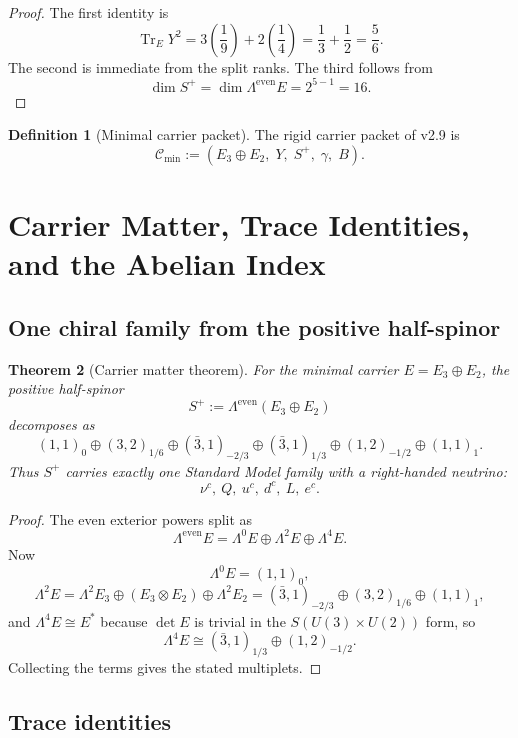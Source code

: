 \documentclass[11pt,a4paper]{article}
\newtheorem{theorem}{Theorem}[section]
\theoremstyle{definition}
\newtheorem{definition}[theorem]{Definition}
\theoremstyle{remark}
\newcommand{\tr}{\operatorname{Tr}}
\newcommand{\Cmin}{\mathcal C_{\min}}
\begin{document}
\begin{proof}
The first identity is
\[
\tr_EY^2 = 3\left(\frac19\right)+2\left(\frac14\right)=\frac13+\frac12=\frac56.
\]
The second is immediate from the split ranks. The third follows from
\[
\dim S^+ = \dim \Lambda^{\mathrm{even}}E = 2^{5-1}=16.
\]
\end{proof}

\begin{definition}[Minimal carrier packet]
The rigid carrier packet of v2.9 is
\[
\Cmin := (E_3\oplus E_2,\;Y,\;S^+,\;\gamma,\;B).
\]
\end{definition}

\section{Carrier Matter, Trace Identities, and the Abelian Index}

\subsection{One chiral family from the positive half-spinor}

\begin{theorem}[Carrier matter theorem]
For the minimal carrier $E=E_3\oplus E_2$, the positive half-spinor
\[
S^+ := \Lambda^{\mathrm{even}}(E_3\oplus E_2)
\]
decomposes as
\[
(1,1)_0
\oplus
(3,2)_{1/6}
\oplus
(\bar 3,1)_{-2/3}
\oplus
(\bar 3,1)_{1/3}
\oplus
(1,2)_{-1/2}
\oplus
(1,1)_1.
\]
Thus $S^+$ carries exactly one Standard Model family with a right-handed neutrino:
\[
\nu^c,\ Q,\ u^c,\ d^c,\ L,\ e^c.
\]
\end{theorem}

\begin{proof}
The even exterior powers split as
\[
\Lambda^{\mathrm{even}}E
=
\Lambda^0 E \oplus \Lambda^2 E \oplus \Lambda^4 E.
\]
Now
\[
\Lambda^0 E = (1,1)_0,
\]
\[
\Lambda^2 E = \Lambda^2 E_3 \oplus (E_3\otimes E_2)\oplus \Lambda^2 E_2
= (\bar 3,1)_{-2/3}\oplus (3,2)_{1/6}\oplus (1,1)_1,
\]
and $\Lambda^4E \cong E^\ast$ because $\det E$ is trivial in the $S(U(3)\times U(2))$ form, so
\[
\Lambda^4E \cong (\bar 3,1)_{1/3}\oplus (1,2)_{-1/2}.
\]
Collecting the terms gives the stated multiplets.
\end{proof}

\subsection{Trace identities}
\end{document}
